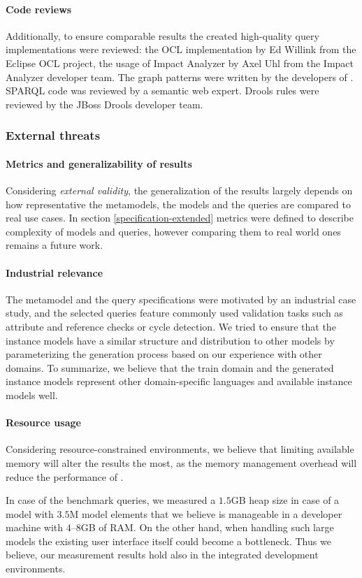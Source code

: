 \paragraph{Code reviews}
Additionally, to ensure comparable
results the created high-quality query implementations were reviewed: the OCL
implementation by Ed Willink from the Eclipse OCL project, the usage of Impact
Analyzer by Axel Uhl from the Impact Analyzer developer team. The graph patterns
were written by the developers of \eiq{}. SPARQL code was reviewed by a semantic web expert. Drools rules were reviewed by the JBoss Drools developer team. 

\subsubsection{External threats}

\paragraph{Metrics and generalizability of results}
Considering \emph{external validity}, the generalization of the results largely
depends on how representative the metamodels, the models and the queries are
compared to real use cases. In section \ref{specification-extended} metrics were
defined to describe complexity of models and queries, however comparing them to
real world ones remains a future work.

\paragraph{Industrial relevance}
The metamodel and the query specifications were motivated by an industrial case
study, and the selected queries feature commonly used validation tasks such as
attribute and reference checks or cycle detection. We tried to ensure that the
instance models have a similar structure and distribution to other models by
parameterizing the generation process based on our experience with other
domains. To summarize, we believe that the train domain and the generated
instance models represent other domain-specific languages and available instance
models well.

\paragraph{Resource usage}
Considering resource-constrained environments, we believe that limiting
available memory will alter the results the most, as the memory management
overhead will reduce the performance of \eiq{}.

In case of the benchmark queries, we measured a $1.5$GB heap size in case of a
model with $3.5$M model elements that we believe is manageable in a developer
machine with $4$--$8$GB of RAM. On the other hand, when handling such large
models the existing user interface itself could become a bottleneck. Thus we
believe, our measurement results hold also in the integrated development
environments.
